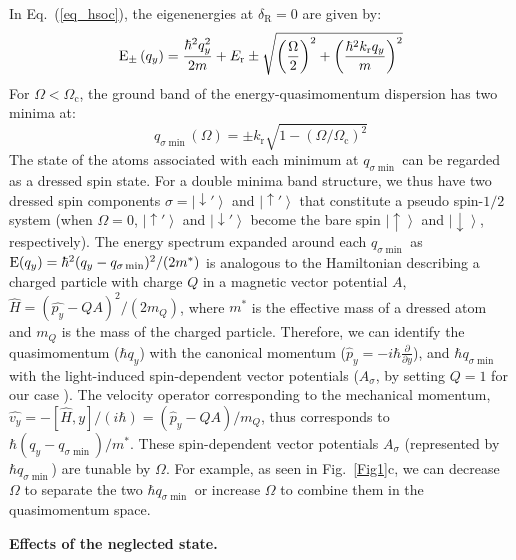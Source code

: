 \documentclass[showpacs,preprintnumbers,amsmath,amssymb, superscriptaddress, aps, reprint]{revtex4-1}
\def\E_r{E_{\text{r}}}
\def\k_r{k_{\text{r}}}
\def\deltaR{\delta_{\text{R}}}
\begin{document}
{{{In Eq.~(\ref{eq_hsoc}), the eigenenergies at ${\deltaR} = 0$ are given by:
\begin{equation}
{{\rm{E}}_ \pm }\left( q_y \right) = \frac{{{\hbar ^2}{q_y^2}}}{{2m}} + {\E_r} \pm \sqrt {{{\left( {\frac{\Omega }{2}} \right)}^2} + {{\left( {\frac{{{\hbar ^2}{\k_r}q_y}}{m}} \right)}^2}}
\end{equation}
For $\Omega < \Omega_{\text{c}}$, the ground band of the energy-quasimomentum dispersion has two minima at:
\begin{equation}
{q_{\sigma \min }}\left( \Omega  \right) =  \pm {\k_r}\sqrt {1 - {{\left( {\Omega /{\Omega_{\text{c}}}} \right)}^2}}
\end{equation}
The state of the atoms associated with each minimum at ${q_{\sigma \min }}$ can be regarded as a dressed spin state. For a double minima band structure, we thus have two dressed spin components $\sigma = \left| { \downarrow '} \right\rangle$ and $\left| { \uparrow '} \right\rangle$ that constitute a pseudo spin-$1/2$ system (when $\Omega = 0$, $\left| { \uparrow '} \right\rangle$ and $\left| { \downarrow '} \right\rangle$ become the bare spin $\left| { \uparrow} \right\rangle$ and $\left| { \downarrow} \right\rangle$, respectively). The energy spectrum expanded around each ${q_{\sigma \min }}$ as ${\rm{E}}(q_y) = \hbar^2(q_y-q_{\sigma \min })^2/(2{m^*})$ is analogous to the Hamiltonian describing a charged particle with charge $Q$ in a magnetic vector potential $A$, {$\hat{H} = ( {\hat{p_y} - QA})^2/(2{m_Q})$}, where ${m^*}$ is the effective mass of a dressed atom and $m_Q$ is the mass of the charged particle. Therefore, we can identify the quasimomentum ($\hbar q_y$) with the canonical momentum {($\hat{p}_{y}=-i\hbar\frac{\partial}{\partial y}$)}, and $ \hbar {q_{\sigma \min }}$ with the light-induced spin-dependent vector potentials ($A_{\sigma}$, by setting $Q=1$ for our case \cite{Beeler_SHE_Nature_2013}). The velocity operator corresponding to the mechanical momentum, {$\hat{v_y}=-[{\hat{H},y}]/(i\hbar) = \left( {\hat{p}_y - QA} \right)/m_Q$}, thus corresponds to $\hbar(q_y - q_{\sigma \min})/m^*$. These spin-dependent vector potentials ${A_\sigma }$ (represented by $ \hbar {q_{\sigma \min }}$) are tunable by $\Omega$. For example, as seen in Fig.~\ref{Fig1}c, we can decrease $\Omega$ to separate the two $\hbar {q_{\sigma \min }}$ or increase $\Omega$ to combine them in the quasimomentum space.

\vspace{5mm}

\textbf{Effects of the neglected {} state.}

}}}
\end{document}
